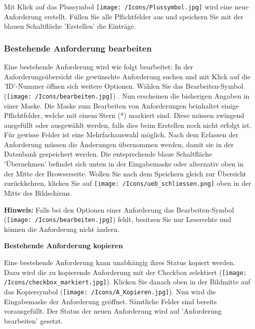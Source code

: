Mit Klick auf das Plussymbol \texttt{[image: /Icons/Plussymbol.jpg]}  wird eine neue Anforderung erstellt. Füllen Sie alle Pflichtfelder aus und speichern Sie mit der blauen Schaltfläche 'Erstellen' die Einträge.

\subsubsection{Bestehende Anforderung bearbeiten}

Eine bestehende Anforderung wird wie folgt bearbeitet: In der Anforderungsübersicht die gewünschte Anforderung suchen und mit Klick auf die 'ID'-Nummer  öffnen sich weitere Optionen. Wählen Sie das Bearbeiten-Symbol (\texttt{[image: /Icons/bearbeiten.jpg]}) . Nun erscheinen die bisherigen Angaben in einer Maske. Die Maske zum Bearbeiten von Anforderungen beinhaltet einige Pflichtfelder, welche mit einem Stern (*) markiert sind. Diese müssen zwingend ausgefüllt oder ausgewählt werden, falls dies beim Erstellen noch nicht erfolgt ist. Für gewisse Felder ist eine Mehrfachauswahl möglich. Nach dem Erfassen der Anforderung müssen die Änderungen übernommen werden, damit sie in der Datenbank gespeichert werden. Die entsprechende blaue Schaltfläche 'Übernehmen' befindet sich unten in der Eingabemaske oder alternativ oben in der Mitte der Browserseite. Wollen Sie nach dem Speichern gleich zur Übersicht zurückkehren, klicken Sie auf \texttt{[image: /Icons/ueb\_schliessen.png]} oben in der Mitte des Bildschirms.

\vspace{.2cm} 

\textbf{Hinweis:} Falls bei den Optionen einer Anforderung das Bearbeiten-Symbol (\texttt{[image: /Icons/bearbeiten.jpg]}) fehlt, besitzen Sie nur Leserechte und können die Anforderung nicht ändern.

\vspace{\baselineskip}

\textbf{Bestehende Anforderung kopieren}

Eine bestehende Anforderung kann unabhängig ihres Status kopiert werden. Dazu wird die zu kopierende Anforderung mit der Checkbox selektiert (\texttt{[image: /Icons/checkbox\_markiert.jpg]}). Klicken Sie danach oben in der Bildmitte auf das Kopiersymbol (\texttt{[image: /Icons/A\_Kopieren.jpg]}). Nun wird die Eingabemaske der Anforderung geöffnet. Sämtliche Felder sind bereits vorausgefüllt. Der Status der neuen Anforderung wird auf 'Anforderung bearbeiten' gesetzt.

